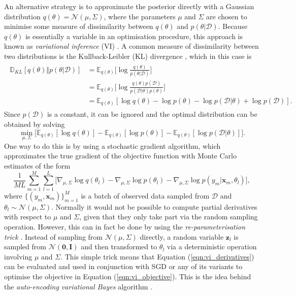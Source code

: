 \documentclass[msc,deptreport.inf]{infthesis} %
\newcommand{\matr}[1]{\mathbf{#1}}
\newcommand{\E}{\mathbb E}
\newcommand{\D}{\mathbb D}
\begin{document}
An alternative strategy is to approximate the posterior directly with a Gaussian distribution $q(\theta) = \mathcal{N}(\mu, \Sigma)$, where the parameters $\mu$ and $\Sigma$ are chosen to minimise some measure of dissimilarity between $q(\theta)$ and $p(\theta | \mathcal{D})$. Because $q(\theta)$ is essentially a variable in an optimisation procedure, this approach is known as \emph{variational inference} (VI) \cite{barber2007}. A common measure of dissimilarity between two distributions is the Kullback-Leibler (KL) divergence \cite{barber2007}, which in this case is
\begin{align}
\begin{split}
	\D_{KL}[q(\theta) \Vert p(\theta | \mathcal{D})] 
	& = \E_{q(\theta)} \Big[\log \frac{q(\theta)}{p(\theta | \mathcal{D})}\Big] \\
	& = \E_{q(\theta)} \Big[\log \frac{q(\theta) p(\mathcal{D})}{p(\mathcal{D} | \theta) p(\theta)}\Big] \\
	& = \E_{q(\theta)} [\log q(\theta) - \log p(\theta) - \log p(\mathcal{D} | \theta) + \log p(\mathcal{D})].
\end{split}
\end{align}
Since $p(\mathcal{D})$ is a constant, it can be ignored and the optimal distribution can be obtained by solving 
\begin{equation}\label{eqn:vi_objective}
	\min_{\mu, \Sigma} \big[ \E_{q(\theta)} [\log q(\theta)] - \E_{q(\theta)} [\log p(\theta) ] - \E_{q(\theta)} [\log p(\mathcal{D} | \theta)] \big].
\end{equation}
One way to do this is by using a stochastic gradient algorithm, which approximates the true gradient of the objective function with Monte Carlo estimates of the form
\begin{equation}\label{eqn:vi_derivatives}
	\frac{1}{ML} \sum_{m=1}^M \sum_{l=1}^L \big[ \nabla_{\mu, \Sigma} \log q(\theta_l) - \nabla_{\mu, \Sigma} \log p(\theta_l) -  \nabla_{\mu, \Sigma} \log p(y_m | \matr{x}_m, \theta_l) \big],
\end{equation}
where $\{(y_m, \matr{x}_m)\}_{m=1}^M$ is a batch of observed data sampled from $\mathcal{D}$ and $\theta_l \sim \mathcal{N}(\mu, \Sigma)$. Normally it would not be possible to compute partial derivatives with respect to $\mu$ and $\Sigma$, given that they only take part via the random sampling operation. However, this can in fact be done by using the \emph{re-parameterisation trick} \cite{goodfellow2016}. Instead of sampling from $\mathcal{N}(\mu, \Sigma)$ directly, a random variable $\matr{z}_l$ is sampled from $\mathcal{N}(\matr{0}, \matr{I})$ and then transformed to $\theta_l$ via a deterministic operation involving $\mu$ and $\Sigma$. This simple trick means that Equation (\ref{eqn:vi_derivatives}) can be evaluated and used in conjunction with SGD or any of its variants to optimise the objective in Equation (\ref{eqn:vi_objective}). This is the idea behind the \emph{auto-encoding variational Bayes} algorithm \cite{kingma2013}.
\end{document}
